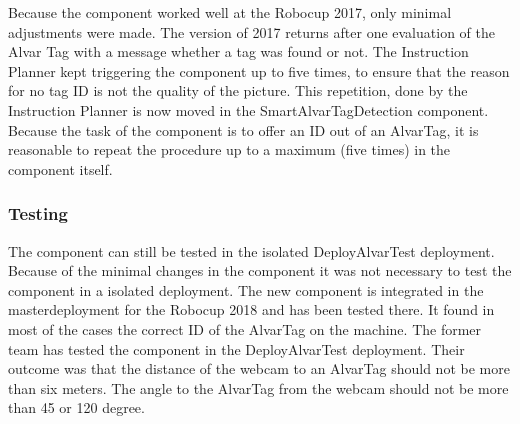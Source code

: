 Because the component worked well at the Robocup 2017, only minimal adjustments were made. The version of 2017 returns after one evaluation of the Alvar Tag with a message whether a tag was found or not. The Instruction Planner kept triggering the component up to five times, to ensure that the reason for no tag ID is not the quality of the picture. 
This repetition, done by the Instruction Planner is now moved in the SmartAlvarTagDetection component. Because the task of the component is to offer an ID out of an AlvarTag, it is reasonable to repeat the procedure up to a maximum (five times) in the component itself.


\subsubsection{Testing}

The component can still be tested in the isolated DeployAlvarTest deployment. Because of the minimal changes in the component it was not necessary to test the component in a isolated deployment. The new component is integrated in the masterdeployment for the Robocup 2018 and has been tested there. It found in most of the cases the correct ID of the AlvarTag on the machine.
The former team has tested the component in the DeployAlvarTest deployment. Their outcome was that the distance of the webcam to an AlvarTag should not be more than six meters. The angle to the AlvarTag from the webcam should not be more than 45 or 120 degree.